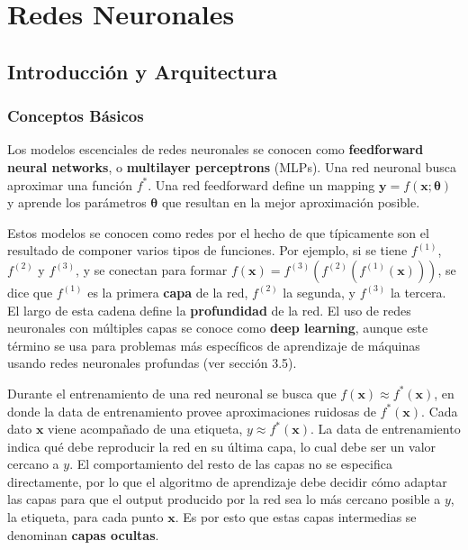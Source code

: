 
\section{Redes Neuronales}

\subsection{Introducci\'on y Arquitectura}

\subsubsection{Conceptos B\'asicos}

Los modelos escenciales de redes neuronales se conocen como \textbf{feedforward neural networks}, o \textbf{multilayer perceptrons} (MLPs). Una red neuronal busca aproximar una funci\'on $f^*$. Una red feedforward define un mapping $\bm{y}=f(\bm{x}; \bm{\theta})$ y aprende los par\'ametros $\bm{\theta}$ que resultan en la mejor aproximaci\'on posible.

Estos modelos se conocen como redes por el hecho de que t\'ipicamente son el resultado de componer varios tipos de funciones. Por ejemplo, si se tiene $f^{(1)}$, $f^{(2)}$ y $f^{(3)}$, y se conectan para formar $f(\bm{x}) = f^{(3)}(f^{(2)}(f^{(1)}(\bm{x})))$, se dice que $f^{(1)}$ es la primera \textbf{capa} de la red, $f^{(2)}$ la segunda, y $f^{(3)}$ la tercera. El largo de esta cadena define la \textbf{profundidad} de la red. El uso de redes neuronales con m\'ultiples capas se conoce como \textbf{deep learning}, aunque este t\'ermino se usa para problemas m\'as espec\'ificos de aprendizaje de m\'aquinas usando redes neuronales profundas (ver secci\'on 3.5).

Durante el entrenamiento de una red neuronal se busca que $f(\bm{x}) \approx f^*(\bm{x})$, en donde la data de entrenamiento provee aproximaciones ruidosas de $f^*(\bm{x})$. Cada dato $\bm{x}$ viene acompa{\~{n}}ado de una etiqueta, $y \approx f^*(\bm{x})$. La data de entrenamiento indica qu\'e debe reproducir la red en su \'ultima capa, lo cual debe ser un valor cercano a $y$. El comportamiento del resto de las capas no se especifica directamente, por lo que el algoritmo de aprendizaje debe decidir c\'omo adaptar las capas para que el output producido por la red sea lo m\'as cercano posible a $y$, la etiqueta, para cada punto $\bm{x}$. Es por esto que estas capas intermedias se denominan \textbf{capas ocultas}.

